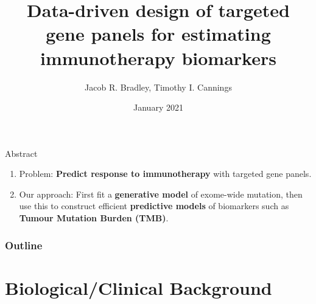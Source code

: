 \documentclass{beamer}
\title[Data-driven targeted gene panels]{Data-driven design of targeted gene panels for estimating immunotherapy biomarkers}
\author[Bradley and Cannings]{Jacob R. Bradley, Timothy I. Cannings}
\date{January 2021}
\begin{document}
\begin{frame}
\titlepage
\end{frame}

\begin{frame}{Abstract}
\begin{enumerate}[I]
    \item Problem: \textbf{Predict response to immunotherapy} with targeted gene panels.
    \item Our approach: First fit a \textbf{generative model} of exome-wide mutation, then use this to construct efficient \textbf{predictive models} of biomarkers such as \textbf{Tumour Mutation Burden (TMB)}.
    
\end{enumerate}
\end{frame}


\begin{frame}
\frametitle{Outline}
\tableofcontents
\end{frame}

\section{Biological/Clinical Background}
\end{document}
